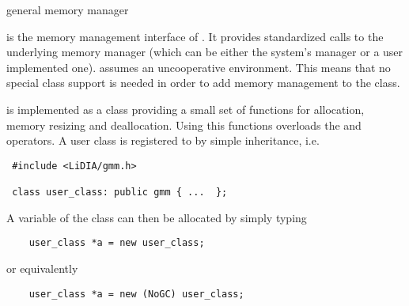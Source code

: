 
\newcommand{\SIZE}{\mathit{SIZE}}
\newcommand{\NMEMB}{\mathit{NMEMB}}
\newcommand{\NSIZE}{\mathit{NSIZE}}
\newcommand{\OSIZE}{\mathit{OSIZE}}
\newcommand{\MODE}{\mathit{MODE}}



\NAME

 \dotfill general memory manager



\ABSTRACT

 is the memory management interface of \LiDIA.  It provides standardized calls to the
underlying memory manager (which can be either the system's manager or a user implemented one).
 assumes an uncooperative environment. This means that no special class support is
needed in order to add memory management to the class.



\DESCRIPTION

 is implemented as a class providing a small set of functions for allocation, memory
resizing and deallocation. Using this functions overloads the  and 
operators.  A user class is registered to  by simple inheritance, i.e.

\begin{verbatim}
 #include <LiDIA/gmm.h>

 class user_class: public gmm { ...  };
\end{verbatim}

A variable of the class  can then be allocated
by simply typing

\begin{verbatim}
    user_class *a = new user_class;
\end{verbatim}

or equivalently

\begin{verbatim}
    user_class *a = new (NoGC) user_class;
\end{verbatim}

